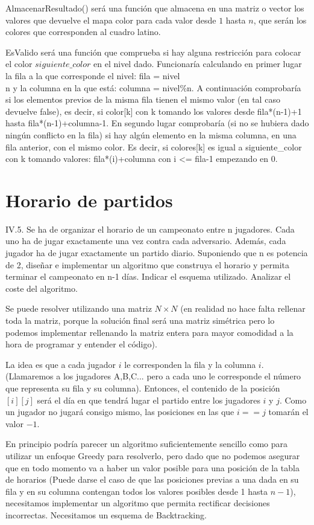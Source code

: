 \documentclass[a4paper, 11pt]{article}
\begin{document}
AlmacenarResultado() será una función que almacena en una matriz o vector los valores que devuelve el mapa color para cada valor desde $1$ hasta $n$, que serán los colores que corresponden al cuadro latino.

EsValido será una función que comprueba si hay alguna restricción para colocar el color $siguiente\_color$ en el nivel dado. Funcionaría calculando en primer lugar la fila a la que corresponde el nivel: fila = nivel\\n y la columna en la que está: columna = nivel\%n. A continuación comprobaría si los elementos previos de la misma fila tienen el mismo valor (en tal caso devuelve false), es decir, si color[k] con k tomando los valores desde fila*(n-1)+1 hasta fila*(n-1)+columna-1. En segundo lugar comprobaría (si no se hubiera dado ningún conflicto en la fila) si hay algún elemento en la misma columna, en una fila anterior, con el mismo color. Es decir, si colores[k] es igual a siguiente\_color con k tomando valores: fila*(i)+columna con i <= fila-1 empezando en 0. 

\section{Horario de partidos}
IV.5. Se ha de organizar el horario de un campeonato entre n jugadores. Cada uno ha de
jugar exactamente una vez contra cada adversario. Además, cada jugador ha de jugar
exactamente un partido diario. Suponiendo que n es potencia de 2, diseñar e implementar un
algoritmo que construya el horario y permita terminar el campeonato en n-1 días. Indicar el
esquema utilizado. Analizar el coste del algoritmo.

Se puede resolver utilizando una matriz $N\times N$ (en realidad no hace falta rellenar toda la matriz, porque la solución final será una matriz simétrica pero lo podemos implementar rellenando la matriz entera para mayor comodidad a la hora de programar y entender el código).

La idea es que a cada jugador $i$ le corresponden la fila y la columna $i$. (Llamaremos a los jugadores A,B,C... pero a cada uno le corresponde el número que representa su fila y su columna). Entonces, el contenido de la posición $[i][j]$ será el día en que tendrá lugar el partido entre los jugadores $i$ y $j$. Como un jugador no jugará consigo mismo, las posiciones en las que $i==j$ tomarán el valor $-1$.

En principio podría parecer un algoritmo suficientemente sencillo como para utilizar un enfoque Greedy para resolverlo, pero dado que no podemos asegurar que en todo momento va a haber un valor posible para una posición de la tabla de horarios (Puede darse el caso de que las posiciones previas a una dada en su fila y en su columna contengan todos los valores posibles desde 1 hasta $n-1$), necesitamos implementar un algoritmo que permita rectificar decisiones incorrectas. Necesitamos un esquema de Backtracking.
\end{document}
